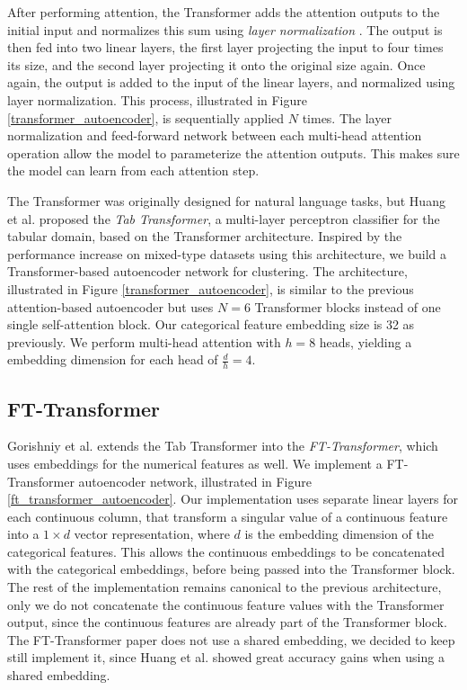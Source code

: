 After performing attention, the Transformer adds the attention outputs to the initial input and normalizes this sum using \textit{layer normalization} \cite{layer_normalization}. The output is then fed into two linear layers, the first layer projecting the input to four times its size, and the second layer projecting it onto the original size again. Once again, the output is added to the input of the linear layers, and normalized using layer normalization. This process, illustrated in Figure \ref{transformer_autoencoder}, is sequentially applied $N$ times. The layer normalization and feed-forward network between each multi-head attention operation allow the model to parameterize the attention outputs. This makes sure the model can learn from each attention step.

The Transformer was originally designed for natural language tasks, but Huang et al. \cite{tab_transformer} proposed the \textit{Tab Transformer}, a multi-layer perceptron classifier for the tabular domain, based on the Transformer architecture. Inspired by the performance increase on mixed-type datasets using this architecture, we build a Transformer-based autoencoder network for clustering. The architecture, illustrated in Figure \ref{transformer_autoencoder}, is similar to the previous attention-based autoencoder but uses $N = 6$ Transformer blocks instead of one single self-attention block. Our categorical feature embedding size is 32 as previously. We perform multi-head attention with $h = 8$ heads, yielding a embedding dimension for each head of $\frac{d}{h} = 4$.

\subsection{FT-Transformer}

Gorishniy et al. extends the Tab Transformer into the \textit{FT-Transformer}, which uses embeddings for the numerical features as well. We implement a FT-Transformer autoencoder network, illustrated in Figure \ref{ft_transformer_autoencoder}. Our implementation uses separate linear layers for each continuous column, that transform a singular value of a continuous feature into a $1 \times d$ vector representation, where $d$ is the embedding dimension of the categorical features. This allows the continuous embeddings to be concatenated with the categorical embeddings, before being passed into the Transformer block. The rest of the implementation remains canonical to the previous architecture, only we do not concatenate the continuous feature values with the Transformer output, since the continuous features are already part of the Transformer block. The FT-Transformer paper does not use a shared embedding, we decided to keep still implement it, since Huang et al. \cite{tab_transformer} showed great accuracy gains when using a shared embedding.


